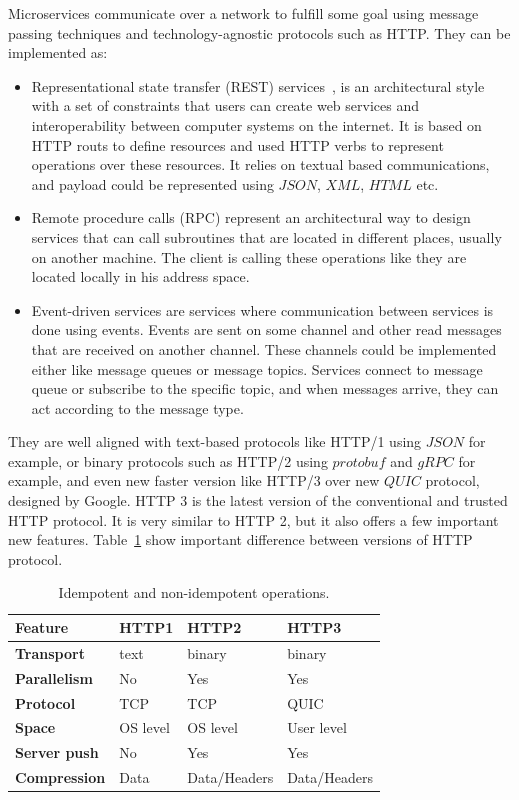 Microservices communicate over a network to fulfill some goal using message passing techniques and technology-agnostic protocols such as HTTP. They can be implemented as:

\begin{itemize}
	\item Representational state transfer (REST) services~\cite{AdamczykSJH11}, is an architectural style with a set of constraints that users can create web services and interoperability between computer systems on the internet. It is based on HTTP routs to define resources and used HTTP verbs to represent operations over these resources. It relies on textual based communications, and payload could be represented using $JSON$, $XML$, $HTML$ etc.
	\item Remote procedure calls (RPC) represent an architectural way to design services that can call subroutines that are located in different places, usually on another machine. The client is calling these operations like they are located locally in his address space.
	\item Event-driven services are services where communication between services is done using events. Events are sent on some channel and other read messages that are received on another channel. These channels could be implemented either like message queues or message topics. Services connect to message queue or subscribe to the specific topic, and when messages arrive, they can act according to the message type.
\end{itemize}
 
 \noindent
They are well aligned with text-based protocols like HTTP/1 using $JSON$ for example, or binary protocols such as HTTP/2 using $protobuf$ and $gRPC$ for example, and even new faster version like HTTP/3 over new $QUIC$ protocol, designed by Google. HTTP 3 is the latest version of the conventional and trusted HTTP protocol. It is very similar to HTTP 2, but it also offers a few important new features. Table~\ref{tab:table9} show important difference between versions of HTTP protocol.
 
 \begin{table}[h!]
 	\begin{center}
 		\begin{tabular}{l|l|l|l}
 			\textbf{Feature} & \textbf{HTTP1} & \textbf{HTTP2} & \textbf{HTTP3}\\
 			\hline
 			\textbf{Transport} & text & binary & binary\\
 			\textbf{Parallelism} & No & Yes & Yes\\
 			\textbf{Protocol} & TCP & TCP & QUIC \\
 			\textbf{Space} & OS level & OS level & User level\\
 			\textbf{Server push} & No & Yes & Yes\\
 			\textbf{Compression} & Data & Data/Headers & Data/Headers\\
 		\end{tabular}
 	\end{center}
 	\vspace{-0.5cm}
 	\caption{Idempotent and non-idempotent operations.}
 	\label{tab:table9}
 \end{table}
 
